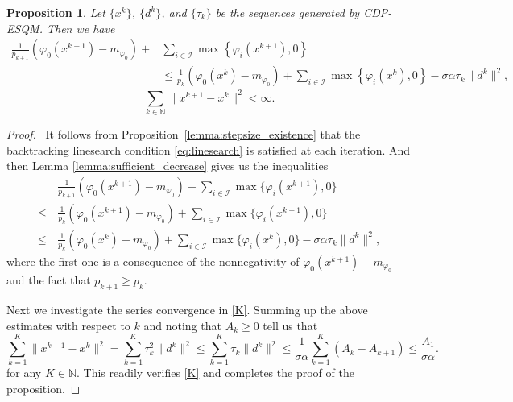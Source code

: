 \documentclass[11pt,a4paper]{article}
\newtheorem{proposition}[theorem]{Proposition}
\theoremstyle{plain}
\begin{document}
\begin{proposition} \label{prop:bounded-subsequence}
Let $\{x^k\}$, $\{d^k\}$, and $\{\tau_k\}$ be the sequences generated by CDP-ESQM. Then we have
\begin{equation*}
\begin{aligned}
\frac{1}{p_{k+1}}\left(\varphi_0(x^{k+1}) - m_{\varphi_0}\right) +& \sum_{i\in\mathcal I} \max\left\{\varphi_i(x^{k+1}), 0\right\}\\
&\le   \frac{1}{p_k}\left(\varphi_0(x^{k}) - m_{\varphi_0}\right)+  \sum_{i\in\mathcal I} \max\left\{\varphi_i(x^{k}), 0\right\} - \sigma\alpha\tau_k\|d^k\|^2,
\end{aligned}
\end{equation*}
\begin{equation}\label{K}
\sum_{k \in \mathbb{N}} \| x^{k+1} - x^k \|^2 < \infty.
\end{equation}
\end{proposition}

\begin{proof}\,
It follows from Proposition~\ref{lemma:stepsize_existence} that the backtracking linesearch condition \eqref{eq:linesearch} is satisfied at each iteration. And then Lemma \ref{lemma:sufficient_decrease} gives us the inequalities
\begin{equation*}
\begin{aligned}
&\frac{1}{p_{k+1}}\left(\varphi_0(x^{k+1}) - m_{\varphi_0}\right) + \sum_{i\in\mathcal I} \max\{\varphi_i(x^{k+1}), 0\} \\
\leq \, &\frac{1}{p_k}\left(\varphi_0(x^{k+1}) - m_{\varphi_0}\right) + \sum_{i\in\mathcal I} \max\{\varphi_i(x^{k+1}), 0\} \\
\leq \, &\frac{1}{p_k}\left(\varphi_0(x^{k})- m_{\varphi_0}\right)+\sum_{i\in\mathcal I} \max\{\varphi_i(x^{k}),0\}
-\sigma\alpha\tau_k\|d^k\|^2,
\end{aligned}
\end{equation*}
where the first one is a consequence of the nonnegativity of $\varphi_0(x^{k+1}) - m_{\varphi_0}$ and the fact that $p_{k+1} \ge p_k$. 


Next we investigate the series convergence in \eqref{K}. 
Summing up the above estimates with respect to $k$ and noting that $A_k \ge 0$ tell us that 
\begin{equation}\label{prop2_eq2}
\sum_{k = 1}^K \|x^{k+1} - x^k\|^2 =  \sum_{k = 1}^K\tau_k^2 \|d^k\|^2 \leq  \sum_{k = 1}^K \tau_k \|d^k\|^2 \leq \frac{1}{\sigma\alpha }  \sum_{k = 1}^K \left(A_k - A_{k+1}\right) \leq \frac{A_1}{\sigma\alpha}.
\end{equation}
for any $K\in\mathbb{N}$. This readily verifies \eqref{K} and completes the proof of the proposition.
\end{proof}\vspace*{0.07in}
\end{document}

